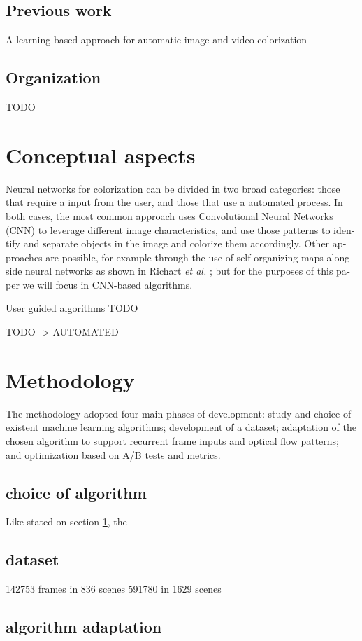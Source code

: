 \documentclass[12pt,openright,twoside,a4paper,english]{abntex2}
\begin{document}
\begin{otherlanguage}{english}
\subsection{Previous work}
A learning-based approach for automatic image and video colorization

\subsection{Organization}
TODO

\section{Conceptual aspects} \label{sec:Concept}
Neural networks for colorization can be divided in two broad categories: those that require a input from the user, and those that use a automated process. In both cases, the most common approach uses Convolutional Neural Networks (CNN) to leverage different image characteristics, and use those patterns to identify and separate objects in the image and colorize them accordingly. Other approaches are possible, for example through the use of self organizing maps along side neural networks as shown in Richart \textit{et al.} \cite{Richart_som_nn}; but for the purposes of this paper we will focus in CNN-based algorithms.

User guided algorithms TODO

TODO -> AUTOMATED

\section{Methodology}
The methodology adopted four main phases of development: study and choice of existent machine learning algorithms; development of a dataset; adaptation of the chosen algorithm to support recurrent frame inputs and optical flow patterns; and optimization based on A/B tests and metrics.

\subsection{choice of algorithm}
Like stated on section \ref{sec:Concept}, the

\subsection{dataset}
142753 frames in 836 scenes
591780 in 1629 scenes


\subsection{algorithm adaptation}


\end{otherlanguage}
\end{document}
